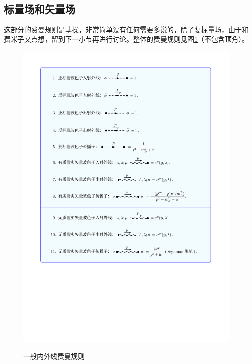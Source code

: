 \subsection{标量场和矢量场}
这部分的费曼规则是基操，非常简单没有任何需要多说的，除了复标量场，由于和费米子又点想，留到下一小节再进行讨论。整体的费曼规则见图\ref{fig.A.3.2}（不包含顶角）。
\begin{figure}[htbp]
	\centering
	\includegraphics[width=\linewidth]{figs/fig20.pdf}
	\label{fig.A.3.2}
	\caption{一般内外线费曼规则}
\end{figure}
